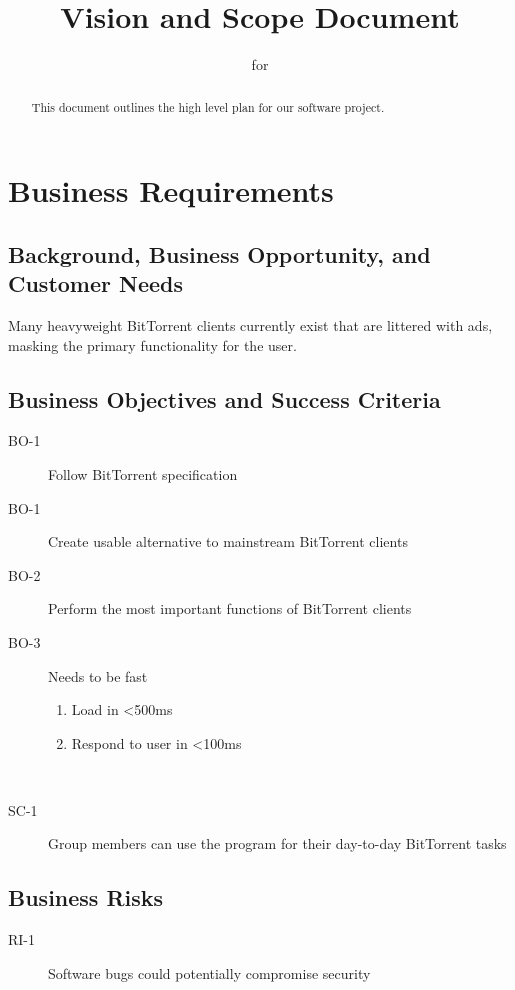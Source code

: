 \documentclass[letter]{scrartcl}
\newcommand{\app}{\sc{393torrent}}
\begin{document}
\title{Vision and Scope Document}
\subtitle{for \app}
\date{} %

\maketitle

\begin{abstract}
This document outlines the high level plan for our software project.
\end{abstract}

\tableofcontents
\pagebreak

\section{Business Requirements}
\subsection{Background, Business Opportunity, and Customer Needs}
Many heavyweight BitTorrent clients currently exist that are littered with ads, masking the primary functionality for the user.

\subsection{Business Objectives and Success Criteria}
\begin{description}
\item[BO-1] Follow BitTorrent specification
\item[BO-1] Create usable alternative to mainstream BitTorrent clients
\item[BO-2] Perform the most important functions of BitTorrent clients
\item[BO-3] Needs to be fast 
\begin{enumerate}
  \item Load in \textless500ms
  \item Respond to user in \textless100ms
\end{enumerate}
\\
\item[SC-1] Group members can use the program for their day-to-day BitTorrent tasks
\end{description}

\subsection{Business Risks}
\begin{description}
\item[RI-1] Software bugs could potentially compromise security
\end{description}
\end{document}
